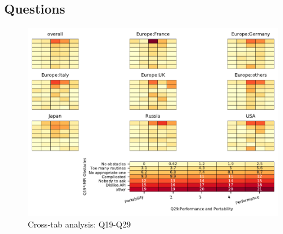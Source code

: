 
\subsection{Questions}


\begin{figure}
\begin{center}
\includegraphics[width=12cm]{../pdfs/Q19-Q29.pdf}
\caption{Cross-tab analysis: Q19-Q29}
\label{fig:Q19-Q29}
\end{center}
\end{figure}

